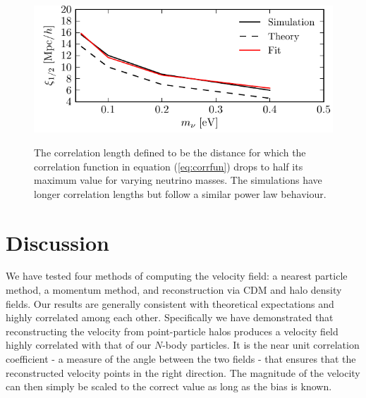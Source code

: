 \begin{figure}[!t]
\begin{center}
\includegraphics[width=\smwidth]{./figures/neutrinos/fig11.pdf} \vspace{-0.1cm}
\caption[Correlation length as a function of neutrino mass]
{The correlation length defined to be the distance for
which the correlation function in equation (\ref{eq:corrfun}) drops
to half its maximum value for varying neutrino masses.  The
simulations have longer correlation lengths but follow a
similar power law behaviour.}
\vspace{-0.2cm}
\label{fig:corrlength}
\end{center}
\end{figure}

  
\section{Discussion}
\label{sec:discussion}
  
We have tested four methods of computing the velocity field: a nearest particle method, a momentum method, and reconstruction via CDM and halo density fields.  Our results are generally consistent with theoretical expectations and highly correlated among each other.  Specifically we have demonstrated that reconstructing the velocity from point-particle halos produces a velocity field highly correlated with that of our $N$-body particles.  It is the near unit correlation coefficient - a measure of the angle between the two fields - that ensures that the reconstructed velocity points in the right direction.  The magnitude of the velocity can then simply be scaled to the correct value as long as the bias is known. 

